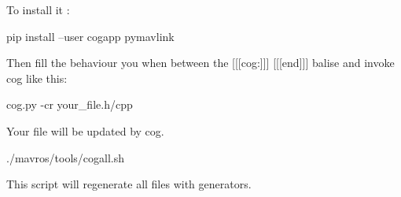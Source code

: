 To install it \+: \begin{DoxyVerb}pip install --user cogapp pymavlink
\end{DoxyVerb}


Then fill the behaviour you when between the {\ttfamily \mbox{[}\mbox{[}\mbox{[}cog\+:\mbox{]}\mbox{]}\mbox{]}} {\ttfamily \mbox{[}\mbox{[}\mbox{[}end\mbox{]}\mbox{]}\mbox{]}} balise and invoke cog like this\+: \begin{DoxyVerb}cog.py -cr your_file.h/cpp
\end{DoxyVerb}


Your file will be updated by cog. \begin{DoxyVerb}./mavros/tools/cogall.sh
\end{DoxyVerb}


This script will regenerate all files with generators. 